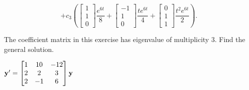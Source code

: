 \documentclass{ximera}
\begin{document}
\begin{problem}
\begin{solution}
$$+c_3\left( \begin{bmatrix}1\\1\\0 \end{bmatrix}\frac{e^{6t} }{8}+ \begin{bmatrix}-1\\1\\0 \end{bmatrix}\frac{t
e^{6t} }{4}+ \begin{bmatrix}0\\1\\1 \end{bmatrix}\frac{t^2e^{6t} }{2}\right).$$


\end{solution}
 \end{problem}

 \begin{problem}\label{exer:10.5.25}
 The coefficient matrix in this exercise
has eigenvalue of multiplicity $3$. Find the
general solution.

$ {\bf y}'
= \begin{bmatrix}1&10&-12\\2&2&3\\2&-1&6\end{bmatrix}{\bf y}$
 \end{problem}
\end{document}
